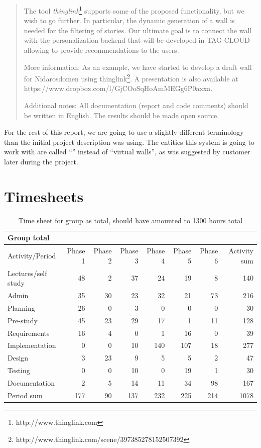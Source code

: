 \documentclass[11pt]{book}
\begin{document}
\begin{quotation}
The tool \emph{thinglink}\footnote{http://www.thinglink.com} supports some of the proposed functionality, but we wish to go further. In particular, the dynamic generation of a wall is needed for the filtering of stories. Our ultimate goal is to connect the wall with the personalization backend that will be developed in TAG-CLOUD allowing to provide recommendations to the users.

More information: As an example, we have started to develop a draft wall for Nidarosdomen using thinglink\footnote{http://www.thinglink.com/scene/397385278152507392}. A presentation is also available at https://www.dropbox.com/l/GjCOoSqHoAmMEGg6P0axxa.

Additional notes: All documentation (report and code comments) should be written in English. The results should be made open source.\cite[p. 47]{compendium}
\end{quotation}

For the rest of this report, we are going to use a slightly different terminology than the initial project description was using. The entities this system is going to work with are called ``\wallentityp'' instead of ``virtual walls'', as was suggested by customer later during the project.


\chapter{Timesheets}
\begin{table}[H]
\centering
\begin{tabular}{| l | r | r | r | r | r | r | r |}
    \hline
    Group total         &          &          &          &          &             &             &              \\ \hline                        
    Activity/Period     & Phase 1  & Phase 2  & Phase  3 & Phase 4  & Phase 5     & Phase 6     & Activity sum \\ \hline
    Lectures/self study & 48 & 2 & 37 & 24 & 19 & 8 & 140\\ \hline
    Admin & 35 & 30 & 23 & 32 & 21 & 73 & 216\\ \hline
    Planning & 26 & 0 & 3 & 0 & 0 & 0 & 30\\ \hline
    Pre-study & 45 & 23 & 29 & 17 & 1 & 11 & 128\\ \hline
    Requirements & 16 & 4 & 0 & 1 & 16 & 0 & 39\\ \hline
    Implementation & 0 & 0 & 10 & 140 & 107 & 18 & 277\\ \hline
    Design & 3 & 23 & 9 & 5 & 5 & 2 & 47\\ \hline
    Testing & 0 & 0 & 10 & 0 & 19 & 1 & 30\\ \hline
    Documentation & 2 & 5 & 14 & 11 & 34 & 98 & 167\\ \hline
    Period sum & 177 & 90 & 137 & 232 & 225 & 214 & 1078\\ \hline
\end{tabular}
\caption{Time sheet for group as total, should have amounted to 1300 hours total}
\label{tab:appendix_timesheets_group}
\end{table}
\end{document}
